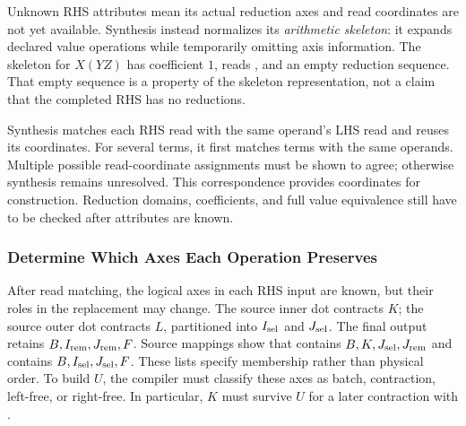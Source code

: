 Unknown RHS attributes mean its actual reduction axes and read coordinates
are not yet available. Synthesis instead normalizes its \emph{arithmetic
skeleton}: it expands declared value operations while temporarily omitting
axis information. The skeleton for $X(YZ)$ has coefficient $1$, reads
\code{[X,Y,Z]}, and an empty reduction sequence. That empty sequence is a
property of the skeleton representation, not a claim that the completed RHS
has no reductions.

Synthesis matches each RHS read with the same operand's LHS read and reuses
its coordinates. For several terms, it first matches terms with the same
operands. Multiple possible read-coordinate assignments must be shown to
agree; otherwise synthesis remains unresolved. This correspondence provides
coordinates for construction. Reduction domains, coefficients, and full
value equivalence still have to be checked after attributes are known.

\FloatBarrier
\subsubsection{Determine Which Axes Each Operation Preserves}
\label{sec:keep-axes}
After read matching, the logical axes in each RHS input are known, but their
roles in the replacement may change. The source inner dot contracts $K$;
the source outer dot contracts $L$, partitioned into $I_{\mathrm{sel}}$ and $J_{\mathrm{sel}}$.
The final output retains $B,I_{\mathrm{rem}},J_{\mathrm{rem}},F$. Source mappings show that
 contains $B,K,J_{\mathrm{sel}},J_{\mathrm{rem}}$ and  contains
$B,I_{\mathrm{sel}},J_{\mathrm{sel}},F$. These lists specify membership rather than physical order.
To build $U$, the compiler must classify these axes as batch, contraction,
left-free, or right-free. In particular, $K$ must survive $U$ for a later
contraction with .

